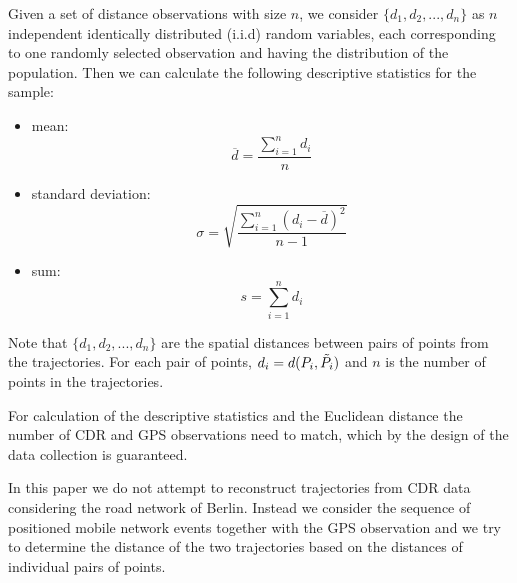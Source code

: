 Given a set of distance observations with size $n$, we consider $\{d_{1}, d_{2}, ..., d_{n}\}$ as $n$ independent identically distributed (i.i.d) random variables, each corresponding to one randomly selected observation and having the distribution of the population. Then we can calculate the following descriptive statistics for the sample:
\begin{itemize}
    \item mean:
     \[ \overline {d} = \frac{\sum_{i=1}^{n} d_{i}}{n}\]
     \item standard deviation:
    \[ \sigma={\sqrt {\frac {\sum _{i=1}^{n}(d_{i}-{\overline {d}})^{2}}{n-1}}}\]
    \item sum:        
    \[s = \sum_{i=1}^{n} d_{i}\]
\end{itemize}

Note that $\{d_{1}, d_{2}, ..., d_{n}\}$ are the spatial distances between pairs of points from the trajectories. For each pair of points, $d_{i} = d(P_{i},\Tilde{P_{i}})$ and $n$ is the number of points in the trajectories.

For calculation of the descriptive statistics and the Euclidean distance the number of CDR and GPS observations need to match, which by the design of the data collection is guaranteed.

In this paper we do not attempt to reconstruct trajectories from CDR data considering the road network of Berlin. Instead we consider the sequence of positioned mobile network events together with the GPS observation and we try to determine the distance of the two trajectories based on the distances of individual pairs of points.



